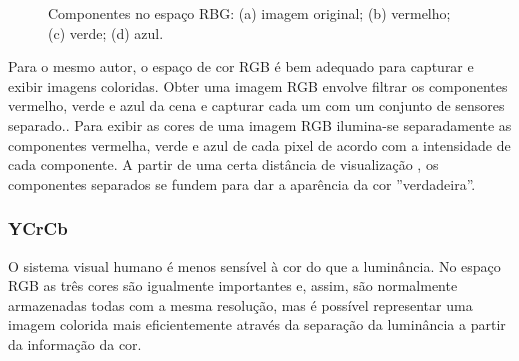 \begin{figure}
{    }
	\qquad
    \caption{Componentes no espaço RBG: (a) imagem original; (b) vermelho; (c) verde; (d) azul.}%
	    
    \label{fig:RGB}%
\end{figure}

Para o mesmo autor, o espaço de cor RGB é bem adequado para capturar e exibir imagens coloridas. Obter uma imagem RGB envolve filtrar os componentes vermelho, verde e azul da cena e capturar cada um com um conjunto de sensores separado.. Para exibir as cores de uma imagem RGB ilumina-se separadamente as componentes vermelha, verde e azul de cada pixel de acordo com a intensidade de cada componente. A partir de uma certa distância de visualização , os componentes separados se fundem para dar a aparência da cor ''verdadeira''. 

\subsubsection{YCrCb}
O sistema visual humano é menos sensível à cor do que a luminância. No espaço RGB as três cores são igualmente importantes e, assim, são normalmente armazenadas todas com a mesma resolução, mas é possível representar uma imagem colorida mais eficientemente através da separação da luminância a partir da informação da cor. \cite{richardson2011h}

